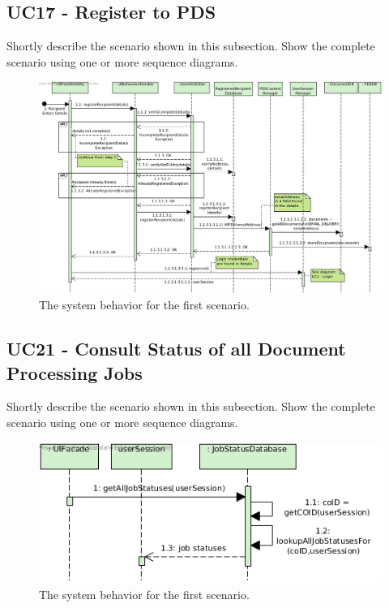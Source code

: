 \subsection{UC17 - Register to PDS}
Shortly describe the scenario shown in this subsection.
Show the complete scenario using one or more sequence diagrams.

\begin{figure}[!htp]
    \centering
    \includegraphics[width=\textwidth]{figures/UC17 - Register to PDS.png}
    \caption{The system behavior for the first scenario.
        }\label{fig:seq_uc17}
\end{figure}

\subsection{UC21 - Consult Status of all Document Processing Jobs}
Shortly describe the scenario shown in this subsection.
Show the complete scenario using one or more sequence diagrams.

\begin{figure}[!htp]
    \centering
    \includegraphics[width=\textwidth]{figures/UC21 - Consult Status of all Document Processing Jobs.png}
    \caption{The system behavior for the first scenario.
        }\label{fig:seq_uc21}
\end{figure}


